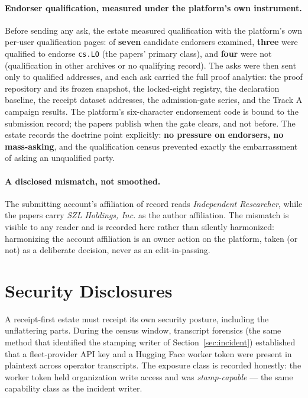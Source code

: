 ﻿\documentclass[11pt]{article}
\begin{document}
\paragraph{Endorser qualification, measured under the platform's own instrument.} Before sending any ask, the estate measured qualification with the platform's own per-user qualification pages: of \textbf{seven} candidate endorsers examined, \textbf{three} were qualified to endorse \texttt{cs.LO} (the papers' primary class), and \textbf{four} were not (qualification in other archives or no qualifying record). The asks were then sent only to qualified addresses, and each ask carried the full proof analytics: the proof repository and its frozen snapshot, the locked-eight registry, the declaration baseline, the receipt dataset addresses, the admission-gate series, and the Track A campaign results. The platform's six-character endorsement code is bound to the submission record; the papers publish when the gate clears, and not before. The estate records the doctrine point explicitly: \textbf{no pressure on endorsers, no mass-asking}, and the qualification census prevented exactly the embarrassment of asking an unqualified party.

\paragraph{A disclosed mismatch, not smoothed.} The submitting account's affiliation of record reads \emph{Independent Researcher}, while the papers carry \emph{SZL Holdings, Inc.} as the author affiliation. The mismatch is visible to any reader and is recorded here rather than silently harmonized: harmonizing the account affiliation is an owner action on the platform, taken (or not) as a deliberate decision, never as an edit-in-passing.

\section{Security Disclosures}
\label{sec:security}

A receipt-first estate must receipt its own security posture, including the unflattering parts. During the census window, transcript forensics (the same method that identified the stamping writer of Section~\ref{sec:incident}) established that a fleet-provider API key and a Hugging Face worker token were present in plaintext across operator transcripts. The exposure class is recorded honestly: the worker token held organization write access and was \emph{stamp-capable} --- the same capability class as the incident writer.
\end{document}
